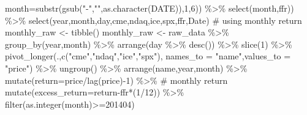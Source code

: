 \documentclass[
  letterpaper,
  DIV=11,
  numbers=noendperiod]{scrreprt}
\newenvironment{Shaded}{\begin{snugshade}}{\end{snugshade}}
\newcommand{\AttributeTok}[1]{\textcolor[rgb]{0.40,0.45,0.13}{#1}}
\newcommand{\CommentTok}[1]{\textcolor[rgb]{0.37,0.37,0.37}{#1}}
\newcommand{\DecValTok}[1]{\textcolor[rgb]{0.68,0.00,0.00}{#1}}
\newcommand{\FunctionTok}[1]{\textcolor[rgb]{0.28,0.35,0.67}{#1}}
\newcommand{\NormalTok}[1]{\textcolor[rgb]{0.00,0.23,0.31}{#1}}
\newcommand{\OtherTok}[1]{\textcolor[rgb]{0.00,0.23,0.31}{#1}}
\newcommand{\SpecialCharTok}[1]{\textcolor[rgb]{0.37,0.37,0.37}{#1}}
\newcommand{\StringTok}[1]{\textcolor[rgb]{0.13,0.47,0.30}{#1}}
\begin{document}
\begin{Shaded}
\begin{Highlighting}[]
                     \AttributeTok{month=}\FunctionTok{substr}\NormalTok{(}\FunctionTok{gsub}\NormalTok{(}\StringTok{"{-}"}\NormalTok{,}\StringTok{""}\NormalTok{,}\FunctionTok{as.character}\NormalTok{(DATE)),}\DecValTok{1}\NormalTok{,}\DecValTok{6}\NormalTok{)) }\SpecialCharTok{\%\textgreater{}\%} 
              \FunctionTok{select}\NormalTok{(month,ffr)) }\SpecialCharTok{\%\textgreater{}\%} 
  \FunctionTok{select}\NormalTok{(year,month,day,cme,ndaq,ice,spx,ffr,Date)}
\CommentTok{\# using monthly return}
\NormalTok{monthly\_raw }\OtherTok{\textless{}{-}} \FunctionTok{tibble}\NormalTok{()}
\NormalTok{monthly\_raw }\OtherTok{\textless{}{-}}\NormalTok{ raw\_data }\SpecialCharTok{\%\textgreater{}\%} 
  \FunctionTok{group\_by}\NormalTok{(year,month) }\SpecialCharTok{\%\textgreater{}\%} 
  \FunctionTok{arrange}\NormalTok{(day }\SpecialCharTok{\%\textgreater{}\%} \FunctionTok{desc}\NormalTok{()) }\SpecialCharTok{\%\textgreater{}\%} 
  \FunctionTok{slice}\NormalTok{(}\DecValTok{1}\NormalTok{) }\SpecialCharTok{\%\textgreater{}\%} 
  \FunctionTok{pivot\_longer}\NormalTok{(.,}\FunctionTok{c}\NormalTok{(}\StringTok{"cme"}\NormalTok{,}\StringTok{"ndaq"}\NormalTok{,}\StringTok{"ice"}\NormalTok{,}\StringTok{"spx"}\NormalTok{),}
               \AttributeTok{names\_to =} \StringTok{"name"}\NormalTok{,}\AttributeTok{values\_to =} \StringTok{"price"}\NormalTok{) }\SpecialCharTok{\%\textgreater{}\%} 
  \FunctionTok{ungroup}\NormalTok{() }\SpecialCharTok{\%\textgreater{}\%} 
  \FunctionTok{arrange}\NormalTok{(name,year,month) }\SpecialCharTok{\%\textgreater{}\%} 
  \FunctionTok{mutate}\NormalTok{(}\AttributeTok{return=}\NormalTok{price}\SpecialCharTok{/}\FunctionTok{lag}\NormalTok{(price)}\SpecialCharTok{{-}}\DecValTok{1}\NormalTok{) }\SpecialCharTok{\%\textgreater{}\%}  \CommentTok{\# monthly return}
  \FunctionTok{mutate}\NormalTok{(}\AttributeTok{excess\_return=}\NormalTok{return}\SpecialCharTok{{-}}\NormalTok{ffr}\SpecialCharTok{*}\NormalTok{(}\DecValTok{1}\SpecialCharTok{/}\DecValTok{12}\NormalTok{)) }\SpecialCharTok{\%\textgreater{}\%} 
  \FunctionTok{filter}\NormalTok{(}\FunctionTok{as.integer}\NormalTok{(month)}\SpecialCharTok{\textgreater{}=}\DecValTok{201404}\NormalTok{)}


\end{Highlighting}
\end{Shaded}
\end{document}
